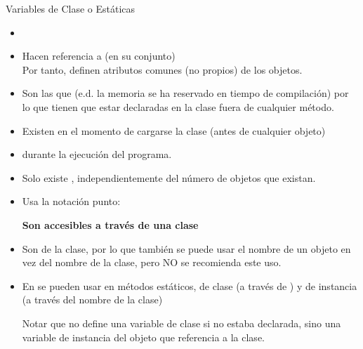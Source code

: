 \documentclass[10pt,envcountsect,spanish]{beamer}
\begin{document}
	
\begin{frame}[t, fragile, label={variableClase}]{Variables de Clase o Estáticas}
\begin{itemize}
		
\item {}
\item Hacen referencia a  (en su conjunto)\\
Por tanto, definen atributos comunes (no propios) de los objetos.

\item Son las que  (e.d. la memoria se ha reservado en tiempo de compilación) por lo que tienen que estar declaradas en la clase fuera de cualquier método.
\item Existen en el momento de cargarse la clase (antes de cualquier objeto)
\item {} durante la ejecución del programa.
\item Solo existe , independientemente del número de objetos que existan.
\item Usa la notación punto: 

\centerline{\textbf{Son accesibles a través de una clase}}

\item Son  de la clase, por lo que 	
también se puede usar el nombre de un objeto en vez del nombre de la clase, pero NO se recomienda este uso.

\item En  se pueden usar en métodos estáticos, de clase (a través de ) y de instancia (a través del nombre de la clase)


Notar que  no define una variable de clase si  no estaba declarada, sino una variable de instancia del objeto que referencia a la clase.
\end{itemize}

\end{frame}
\end{document}
